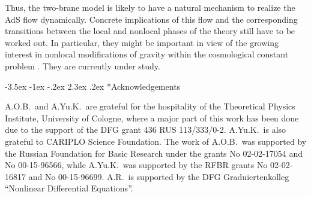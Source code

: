 \documentclass[a4paper,12pt]{article}
\makeatletter
\renewcommand\section{\@startsection {section}{1}{\z@}%
                                   {-3.5ex \@plus -1ex \@minus -.2ex}%
                                   {2.3ex \@plus.2ex}%
                                   {\normalfont\large\bfseries}}
\makeatother
\begin{document}
Thus, the two-brane model is likely to have a natural
mechanism to realize the AdS flow dynamically. Concrete implications
of this flow and the corresponding transitions between the local
and nonlocal phases of the theory still have to be worked out.
In particular, they might be important in view of the growing
interest in nonlocal modifications of gravity within the
cosmological constant problem \cite{AHDDG}. They are currently
under study.

\section*{Acknowledgements}

A.O.B.\ and A.Yu.K.\ are grateful for the
hospitality of the Theoretical Physics Institute, University of Cologne, where
a major part of this work has been done due to the support of the DFG grant
436 RUS 113/333/0-2. A.Yu.K.\ is also grateful to CARIPLO Science Foundation.
The work of A.O.B.\ was supported by the Russian  Foundation for
Basic Research under the grants No 02-02-17054 and No 00-15-96566, while
A.Yu.K.\ was supported by the RFBR grants No 02-02-16817 and
No 00-15-96699. A.R.\ is supported by the DFG Graduiertenkolleg
``Nonlinear Differential Equations''.
\end{document}
